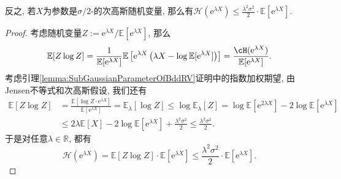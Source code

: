 \begin{remark}
	反之, 若$X$为参数是$\sigma/2$-的次高斯随机变量, 那么有$\mathcal{H}(\mathrm{e}^{\lambda X}) \leq \frac{\lambda^2 \sigma^2}{2} \cdot \mathbb{E}[\mathrm{e}^{\lambda X}]$. 
	\begin{proof}
		考虑随机变量$Z := \mathrm{e}^{\lambda X} / \mathbb{E}[\mathrm{e}^{\lambda X}]$, 那么
		\begin{equation*}
			\mathbb{E}[Z \log Z] 
			= \frac{1}{\mathbb{E}[\mathrm{e}^{\lambda X}]} \mathbb{E} \left[ \mathrm{e}^{\lambda X} \left(\lambda X - \log \mathbb{E}[\mathrm{e}^{\lambda X}] \right) \right]
			= \frac{\cH(\mathrm{e}^{\lambda X})}{\mathbb{E}[\mathrm{e}^{\lambda X}]}. 
		\end{equation*}
		考虑引理\ref{lemma:SubGaussianParameterOfBddRV}证明中的指数加权期望, 由Jensen不等式和次高斯假设, 我们还有
		\begin{align*}
			\mathbb{E}[Z \log Z]
			&= \frac{\mathbb{E}[\log Z \cdot \mathrm{e}^{\lambda X}]}{\mathbb{E}[\mathrm{e}^{\lambda X}]}
			= \mathbb{E}_{\lambda}[\log Z]
			\leq \log \mathbb{E}_{\lambda} [Z]
			= \log \mathbb{E}[\mathrm{e}^{2\lambda X}] - 2 \log \mathbb{E}[\mathrm{e}^{\lambda X}] \\
			&\leq 2\lambda \mathbb{E}[X] - 2 \log \mathbb{E}[\mathrm{e}^{\lambda X}] + \frac{\lambda^2 \sigma^2}{2}
			\leq \frac{\lambda^2 \sigma^2}{2}. 
		\end{align*}
		于是对任意$\lambda \in \mathbb{R}$, 都有
		\begin{equation*}
			\mathcal{H}(\mathrm{e}^{\lambda X})
			= \mathbb{E}[Z \log Z] \cdot \mathbb{E}[\mathrm{e}^{\lambda X}]
			\leq \frac{\lambda^2 \sigma^2}{2} \cdot \mathbb{E}[\mathrm{e}^{\lambda X}]. 
		\end{equation*}
	\end{proof}
\end{remark}

